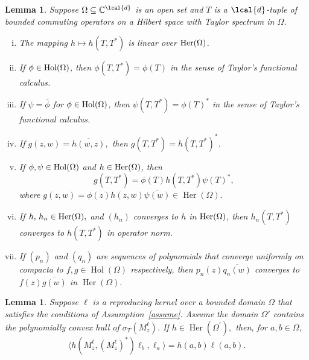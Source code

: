 \documentclass[a4paper,reqno,index]{amsart}
\numberwithin{equation}{section}
\newtheorem{lemma}[theorem]{Lemma}
\newcommand{\CC}{\mathbb{C}}
\newcommand{\specT}{\sigma_T}  %
\newcommand{\ol}[1]{\overline{#1}}
\newcommand{\Her}{\operatorname{Her}}
\newcommand{\hol}{\operatorname{Hol}}
\theoremstyle{definition}
\begin{document}
\begin{lemma} \label{l:Her-calc}
  Suppose $\Omega\subseteq \CC^{\lcal{d}}$ is an open set   and $T$ is a
  $\lcal{d}$-tuple of bounded commuting operators on a Hilbert space with Taylor spectrum in $\Omega$.
\begin{enumerate}[(i)]\itemsep=6pt
    \item  The mapping $h\mapsto h(T, T^*)$ is linear over $\textup{Her}(\Omega)$.
    
\item If $\phi\in\textup{Hol}(\Omega)$, then $\phi(T, T^*)=\phi(T)$ in the sense of Taylor's functional calculus.


\item If $\psi=\bar{\phi}$ for $\phi\in\textup{Hol}(\Omega)$, then 
$\psi(T, T^*)=\phi(T)^*$ in the sense of Taylor's functional calculus.
    
\item If $g(z, w)=\overline{h(w, z)},$ then $g(T, T^*)=h(T, T^*)^*$.

    \item  If $\phi, \psi\in\textup{Hol}(\Omega)$ and
    $h\in\textup{Her}(\Omega)$, then 
    \[g(T, T^*)=\phi(T)h(T, T^*)\psi(T)^*,\]
 where  $g(z, w)=\phi(z)h(z, w)\overline{\psi(w)}\in \Her(\Omega).$
 
    \item  \label{i:her-calc:v}  If $h, \, h_n \in \textup{Her}(\Omega),$ and  
    $(h_n)$ converges to  $h$ in $\textup{Her}(\Omega)$, then $h_n(T, T^*)$ converges to $h(T, T^*)$ in operator norm. 

     \item  \label{i:for-coext}
       If $(p_n)$ and $(q_n)$ are sequences of polynomials that converge uniformly on compacta 
      to $f,g\in \hol(\Omega)$ respectively,   then 
       $p_n(z)\ol{q_n(w)}$ converges to $f(z)\ol{g(w)}$ in $\Her{(\Omega)}.$  
\end{enumerate}
\end{lemma}


\begin{lemma}
 \label{l:her-calc+}
    Suppose $\ell$ is a reproducing  kernel  over a bounded domain $\Omega$ that 
   satisfies the conditions of Assumption~\ref{assume}. Assume the 
   domain $\Omega'$ contains the polynomially convex hull of $\specT (M^{\ell}_z)$.
    If  $h\in\Her(\Omega^\prime),$ then, for $a, b\in \Omega,$
\[
 \langle h(M^{\ell}_z, (M^\ell_z)^*) \ell_b,\ell_a \rangle = h(a,b)\ell(a, b).
\]
\end{lemma} 
\end{document}
